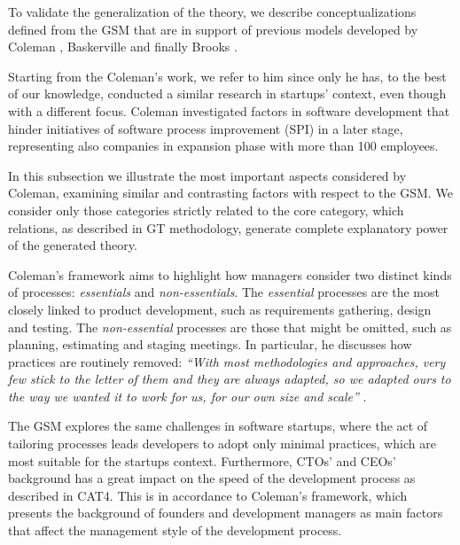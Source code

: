 \documentclass[10pt,journal,letterpaper,compsoc]{IEEEtran}
\begin{document}
To validate the generalization of the theory, we describe conceptualizations 
defined from the GSM that are in support of previous models developed by 
Coleman \cite{Coleman2007,Coleman2008a, Coleman2008}, Baskerville 
\cite{Internet} and finally Brooks \cite{BrooksJr1987}. 

Starting from the Coleman's work, we refer to him since only he has,  to the 
best of our knowledge, conducted a similar research in startups' context, even 
though with a different focus. Coleman investigated factors in software 
development that hinder initiatives of software process improvement (SPI) in a 
later stage, representing also companies in expansion phase with more than 100 
employees. %

In this subsection we illustrate the most important aspects considered by 
Coleman, examining similar and contrasting factors with respect to the GSM. We 
consider only those categories strictly related to the core category, which 
relations, as described in GT methodology, generate complete explanatory power 
of the generated theory. 

Coleman's framework aims to highlight how managers consider two distinct kinds 
of processes: \textit{essentials} and \textit{non-essentials}. The 
\textit{essential} processes are the most closely linked to product development, 
such as requirements gathering, design and testing. The \textit{non-essential} 
processes are those that might be omitted, such as planning, estimating and 
staging meetings. In particular, he discusses how practices are routinely 
removed: \textit{``With most methodologies and approaches, very few stick to the 
letter of them and they are always adapted, so we adapted ours to the way we 
wanted it to work for us, for our own size and scale''} \cite{Coleman2008}. 

The GSM explores the same challenges in software startups, where the act of 
tailoring processes leads developers to adopt only minimal practices, which are 
most suitable for the startups context. Furthermore, CTOs' and CEOs' background 
has a great impact on the speed of the development process as described in CAT4. 
This is in accordance to Coleman's framework, which presents the background of 
founders and development managers as main factors that affect the management 
style of the development process.
\end{document}
